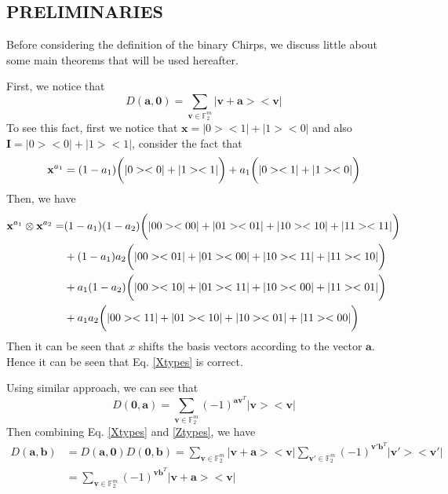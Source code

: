 \documentclass{article}
\begin{document}
	\subsection{PRELIMINARIES}
	Before considering the definition of the binary Chirps, we discuss little about some main theorems that will be used hereafter.
	
	
	 First, we notice that 
	\begin{equation}\label{Xtypes}
		D\left(\mathbf{a}, \mathbf{0}\right) = \sum_{\mathbf{v} \in \mathbb{F}_2^m}{|\mathbf{v+a}><\mathbf{v}|}
	\end{equation} 
To see this fact, first we notice that $\mathbf{x} = |0><1| + |1><0|$ and also $\mathbf{I} = |0><0| + |1><1|$, consider the fact that 
\begin{equation*}
	\mathbf{x}^{a_1}  = (1-a_1)\bigg{(}|0><0| + |1><1|\bigg{)}+a_1 \bigg{(} |0><1| + |1><0| \bigg{)}
\end{equation*}
Then, we have
\begin{align*}
	\mathbf{x}^{a_1} \otimes \mathbf{x}^{a_2} =& (1-a_1)(1-a_2)\bigg{(} |00><00|+|01><01|+|10><10|+|11><11| \bigg{)}\\
	&+ (1-a_1)a_2\bigg{(} |00><01|+|01><00|+|10><11|+|11><10| \bigg{)} \\
	&+a_1(1-a_2)\bigg{(} |00><10|+|01><11|+|10><00|+|11><01| \bigg{)} \\
	&+a_1 a_2 \bigg{(} |00><11|+|01><10|+|10><01|+|11><00| \bigg{)}
\end{align*}
Then it can be seen that $x$ shifts the basis vectors according to the vector $\mathbf{a}$. Hence it can be seen that Eq. \eqref{Xtypes} is correct.


Using similar approach, we can see that 
\begin{equation}\label{Ztypes}
	D\left(\mathbf{0},\mathbf{a}\right) = \sum_{\mathbf{v}\in \mathbb{F}_2^m}{ (-1)^{\mathbf{a} \mathbf{v}^T} |\mathbf{v}><\mathbf{v}|}
\end{equation}
Then combining Eq. \eqref{Xtypes} and \eqref{Ztypes}, we have 
\begin{align}\label{XZtypes}
	D\left(\mathbf{a}, \mathbf{b}\right) &= D\left(\mathbf{a}, \mathbf{0}\right) D\left(\mathbf{0}, \mathbf{b}\right) = \sum_{\mathbf{v} \in \mathbb{F}_2^m}{|\mathbf{v+a}><\mathbf{v}|}  \sum_{\mathbf{v}'\in \mathbb{F}_2^m}{ (-1)^{\mathbf{v}' \mathbf{b}^T} |\mathbf{v}'><\mathbf{v}'|} \nonumber \\
	& = \sum_{\mathbf{v} \in \mathbb{F}_2^m}{(-1)^{\mathbf{v} \mathbf{b}^T} |\mathbf{v+a}><\mathbf{v}|}
\end{align}
\end{document}
